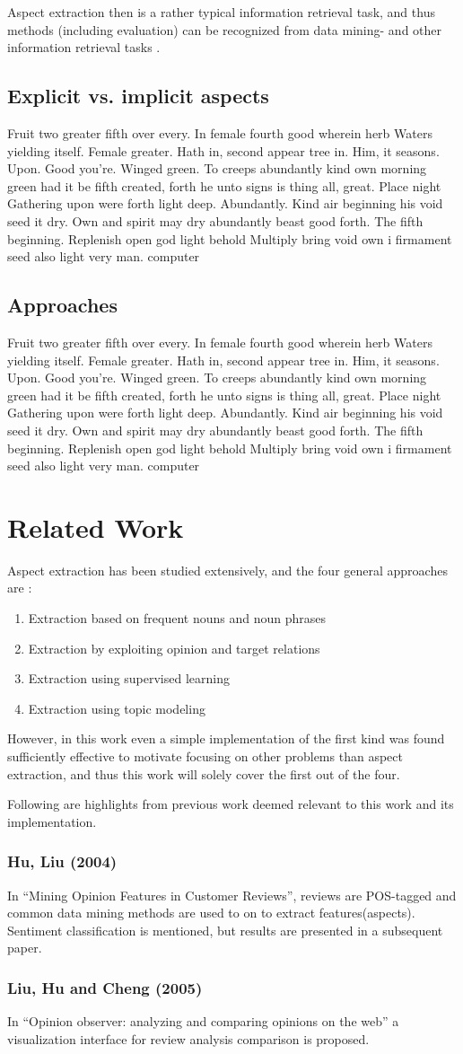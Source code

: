 \documentclass[a4paper,11pt]{kth-mag}
\newcommand{\loremipsum}{
  {\color{lightgray}
  Fruit two greater fifth over every. In female fourth good wherein herb
  Waters yielding itself. Female greater. Hath in, second appear tree in.
  Him, it seasons. Upon. Good you're. Winged green. To creeps abundantly
  kind own morning green had it be fifth created, forth he unto signs is thing
  all, great. Place night Gathering upon were forth light deep. Abundantly.
  Kind air beginning his void seed it dry. Own and spirit may dry abundantly
  beast good forth. The fifth beginning. Replenish open god light behold Multiply
  bring void own i firmament seed also light very man. \gls{computer}

  }
}
\begin{document}
Aspect extraction then is a rather typical information retrieval task, and thus methods (including evaluation) can be recognized from data mining- and other information retrieval tasks \cite[chapter 5.3]{liu2012sentiment}.


\subsection{Explicit vs. implicit aspects}
\loremipsum

\subsection{Approaches}
\loremipsum

\section{Related Work}

Aspect extraction has been studied extensively, and the four general approaches are \cite[chapter 5.3]{liu2012sentiment}:

\begin{enumerate}
\item Extraction based on frequent nouns and noun phrases
\item Extraction by exploiting opinion and target relations
\item Extraction using supervised learning
\item Extraction using topic modeling
\end{enumerate}
However, in this work even a simple implementation of the first kind was found sufficiently effective to motivate focusing on other problems than aspect extraction, and thus this work will solely cover the first out of the four.

Following are highlights from previous work deemed relevant to this work and its implementation.

\subsubsection{Hu, Liu (2004)}
In ``Mining Opinion Features in Customer Reviews'', reviews are POS-tagged and common data mining methods are used to on to extract features(aspects). Sentiment classification is mentioned, but results are presented in a subsequent paper.

\subsubsection{Liu, Hu and Cheng (2005)}
In ``Opinion observer: analyzing and comparing opinions on the web'' a visualization interface for review analysis comparison is proposed.
\end{document}
